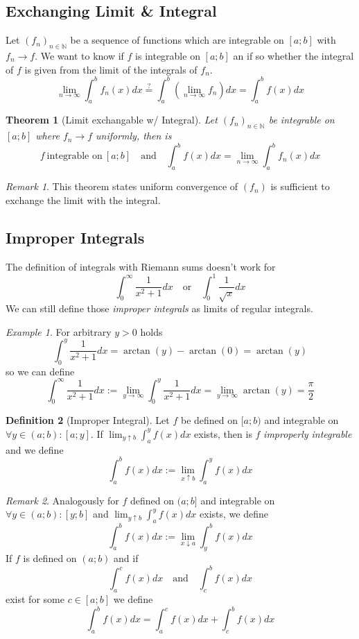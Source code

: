 \documentclass[english,titlepage]{uzhpub}
\theoremstyle{definition}
\newtheorem{definition}{Definition}[section]
\theoremstyle{plain}
\newtheorem{theorem}[definition]{Theorem} %
\theoremstyle{remark}
\newtheorem*{remark}{Remark}
\theoremstyle{example}
\newtheorem*{example}{Example}
\begin{document}
   \subsection{Exchanging Limit \& Integral}
   Let \((f_n)_{n \in \mathbb{N}}\) be a sequence of functions which are integrable on \([a;b]\) with \(f_n \to f\).
   We want to know if \(f\) is integrable on \([a;b]\) an if so whether the integral of \(f\) is given from the limit of the integrals of \(f_n\).
   \[\lim_{n \to \infty} \int_a^b f_n(x) dx \overset{\text{?}}{=} \int_a^b \left(\lim_{n \to \infty} f_n\right) dx = \int_a^b f(x) dx\]

   \begin{theorem}[Limit exchangable w/ Integral]\label{thm:exchange_limit_integr}
      Let \((f_n)_{n \in \mathbb{N}}\) be integrable on \([a;b]\) where \(f_n \to f\) uniformly, then is
      \[f~\text{integrable on}~[a;b] \quad\text{and}\quad \int_a^b f(x) dx = \lim_{n \to \infty} \int_a^b f_n(x) dx\]
   \end{theorem}
   \begin{remark}
      This theorem states uniform convergence of \((f_n)\) is sufficient to exchange the limit with the integral.
   \end{remark}

   \subsection{Improper Integrals}
   The definition of integrals with Riemann sums doesn't work for
   \[\int_0^\infty \frac{1}{x^2 + 1}dx \quad\text{or}\quad \int_0^1 \frac{1}{\sqrt{x}}dx\]
   We can still define those \textit{improper integrals} as limits of regular integrals.
   \begin{example}
      For arbitrary \(y > 0\) holds
      \[\int_0^y \frac{1}{x^2 + 1} dx = \arctan(y) - \arctan(0) = \arctan(y)\]
      so we can define
      \[\int_0^\infty \frac{1}{x^2 + 1}dx := \lim_{y \to \infty} \int_0^y \frac{1}{x^2 + 1}dx = \lim_{y \to \infty} \arctan(y) = \frac{\pi}{2}\]
   \end{example}

   \begin{definition}[Improper Integral]
      Let \(f\) be defined on \([a;b)\) and integrable on \(\forall y \in (a;b): [a;y]\).
      If \(\lim_{y \uparrow b} \int_a^y f(x) dx\) exists, then is \(f\) \textit{improperly integrable} and we define
      \[\int_a^b f(x) dx := \lim_{x \uparrow b}\int_a^y f(x) dx\]
   \end{definition}
   \begin{remark}
      Analogously for \(f\) defined on \((a; b]\) and integrable on \(\forall y \in (a;b): [y; b]\) and \(\lim_{y \uparrow b} \int_a^y f(x) dx\) exists, we define
      \[\int_a^b f(x) dx := \lim_{x \downarrow a}\int_y^b f(x) dx\]
      If \(f\) is defined on \((a;b)\) and if
      \[\int_a^c f(x)dx \quad\text{and}\quad \int_c^b f(x)dx\]
      exist for some \(c \in [a;b]\) we define
      \[\int_a^b f(x)dx = \int_a^c f(x)dx + \int_c^b f(x) dx\]
   \end{remark}
\end{document}
